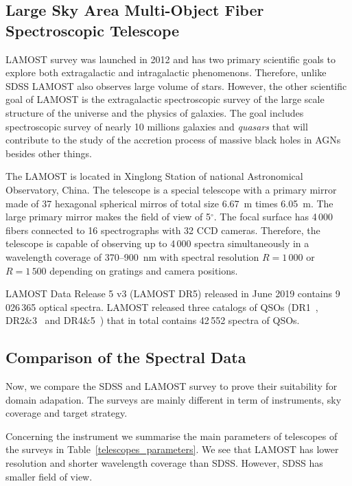 \subsection{Large Sky Area Multi-Object Fiber Spectroscopic Telescope}
\label{lamost}

LAMOST survey was launched in 2012
and has two primary scientific goals to explore both extragalactic
and intragalactic phenomenons.
Therefore, unlike SDSS LAMOST also observes large volume of stars.
However, the other scientific goal of LAMOST is the extragalactic spectroscopic survey of the large scale structure of the universe and the physics of galaxies.
The goal includes spectroscopic survey of nearly 10 millions galaxies and \textit{quasars}
that will contribute to the study of the accretion process of massive black holes in AGNs besides other things.~\cite{cui2012}

The LAMOST is located in Xinglong Station of national Astronomical Observatory, China.
The telescope is a special telescope with a primary mirror made of 37 hexagonal spherical mirros of total size 6.67~m times 6.05~m.
The large primary mirror makes the field of view of 5\(^{\circ}\).
The focal surface has 4\,000 fibers connected to 16 spectrographs with 32 CCD cameras.
Therefore, the telescope is capable of observing up to 4\,000 spectra simultaneously
in a wavelength coverage of 370--900~nm with spectral resolution \(R = 1\,000\) or \(R = 1\,500\) depending on gratings and camera positions.~\cite{cui2012}

LAMOST Data Release 5 v3 (LAMOST DR5) released in June 2019
contains 9\,026\,365 optical spectra.
LAMOST released three catalogs of QSOs
(DR1~\cite{ai2016}, DR2\&3~\cite{dong2018} and DR4\&5~\cite{yao2019})
that in total contains 42\,552 spectra of QSOs.

\subsection{Comparison of the Spectral Data}

Now, we compare the SDSS and LAMOST survey
to prove their suitability for domain adapation.
The surveys are mainly different in term of instruments, sky coverage and target strategy.

Concerning the instrument we summarise the main parameters of telescopes
of the surveys in Table~\ref{telescopes_parameters}.
We see that LAMOST has lower resolution and shorter wavelength coverage than SDSS.
However, SDSS has smaller field of view.

